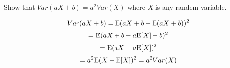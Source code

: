\question Show that $Var(aX + b) = a^2 Var(X)$ where $X$ is any random variable.

\begin{solution}[1.5 cm]
$$Var(aX + b) = \text{E}(aX + b - \text{E}(aX + b))^2$$
$$= \text{E}(aX + b - a\text{E}[X] - b)^2$$
$$= \text{E}(aX - a\text{E}[X])^2$$
$$= a^2 \text{E}(X - \text{E}[X])^2 = a^2 Var(X)$$
\end{solution}